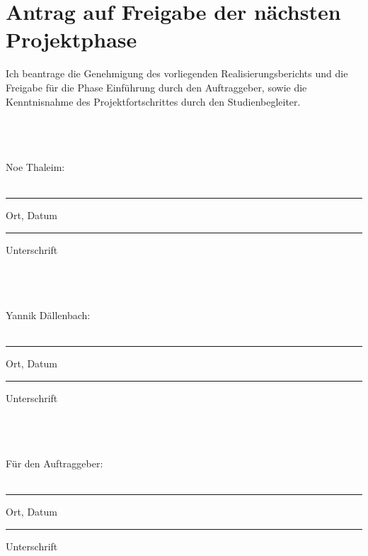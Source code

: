 \section{Antrag auf Freigabe der nächsten Projektphase}
Ich beantrage die Genehmigung des vorliegenden Realisierungsberichts und die Freigabe für die Phase Einführung durch den Auftraggeber, sowie die Kenntnisnahme des Projektfortschrittes durch den Studienbegleiter.

\\ \\ \\
Noe Thaleim:
\\ \\
\parbox{4cm}{\hrule
\strut \centering\footnotesize Ort, Datum} \hfill\parbox{4cm}{\hrule
\strut \centering\footnotesize Unterschrift}
\\ \\ \\
Yannik Dällenbach:
\\ \\
\parbox{4cm}{\hrule
\strut \centering\footnotesize Ort, Datum} \hfill\parbox{4cm}{\hrule
\strut \centering\footnotesize Unterschrift}
\\ \\ \\
Für den Auftraggeber:
\\ \\
\parbox{4cm}{\hrule
\strut \centering\footnotesize Ort, Datum} \hfill\parbox{4cm}{\hrule
\strut \centering\footnotesize Unterschrift}
